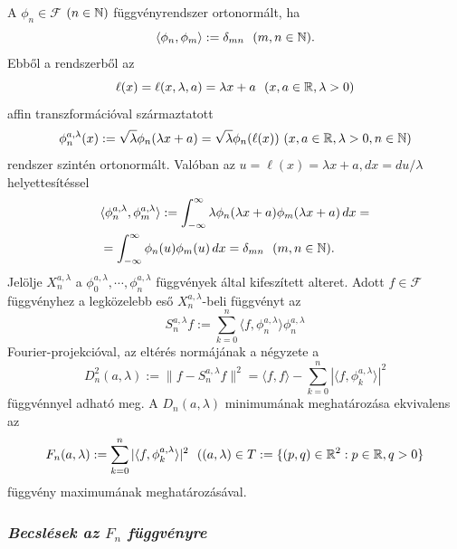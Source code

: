\documentclass[oneside,titlepage,12pt,a4paper]{report}
\begin{document}
A  $\phi_n\in \mathcal F$ $(n\in\Bbb N)$ függvényrendszer  ortonormált, ha
$$
\langle \phi_n,\phi_m\rangle:=\delta_{mn}\ \ (m,n\in\Bbb N).
$$
Ebből a rendszerből az
$$
\ell(x)=\ell(x,\lambda, a)=\lambda x+a\ \ (x,a\in\Bbb R,\lambda>0)
$$
affin transzformációval származtatott
$$
\phi_n^{a,\lambda}(x):=\sqrt \lambda \phi_n(\lambda x+a)=\sqrt \lambda \phi_n(\ell(x)) \ (x,a\in\Bbb R,\lambda>0, n\in\Bbb N)
$$
rendszer szintén ortonormált. Valóban az $u=\ell(x)=\lambda x+a, dx=du/\lambda $ helyettesítéssel
\begin{equation}
\begin{split}
&\langle \phi_n^{a,\lambda},\phi_m^{a,\lambda}\rangle:=
\int_{-\infty}^\infty\lambda \phi_n(\lambda x+a)\phi_m(\lambda x+a)\, dx=\\
&=\int_{-\infty}^\infty \phi_n(u)\phi_m(u)\, dx=
\delta_{mn}\ \ (m,n\in\Bbb N).
\end{split}
\end{equation}
Jelölje  $X_n^{a,\lambda}$ a $\phi_0^{a,\lambda},\cdots,\phi_n^{a,\lambda}$ függvények által kifeszített alteret. Adott $f\in \mathcal F$ függvényhez a legközelebb eső $X_n^{a,\lambda}$-beli függvényt az
$$
S_n^{a,\lambda}f:=\sum_{k=0}^n \langle f,\phi_n^{a,\lambda}\rangle\phi_n^{a,\lambda}
$$
Fourier-projekcióval, az eltérés normájának a  négyzete  a
$$
D_n^2(a,\lambda):=\|f-S_n^{a,\lambda}f\|^2=\langle f,f\rangle-\sum_{k=0}^n |\langle f,\phi_k^{a,\lambda}\rangle|^2
$$
függvénnyel adható meg. A $D_n(a,\lambda)$ minimumának meghatározása ekvivalens az
$$
F_n(a,\lambda):=\sum_{k=0}^n |\langle f,\phi_k^{a,\lambda}\rangle|^2\ \
((a,\lambda)\in T:=\{(p,q)\in\Bbb R^2:p\in\Bbb R, q>0\}
$$
függvény maximumának meghatározásával.

\subsubsection{\it  Becslések az $F_n$ függvényre}
\end{document}
